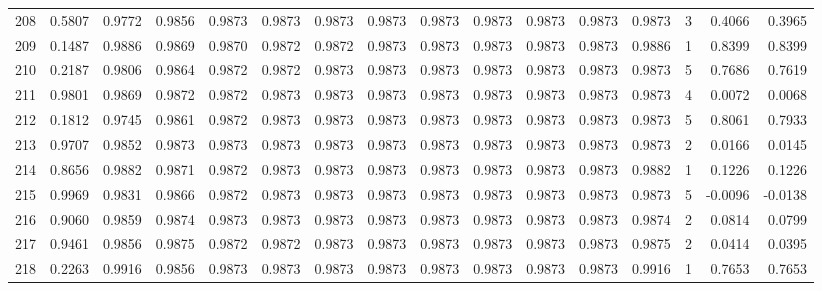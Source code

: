 \begin{tabular}{lrrrrrrrrrrrrrrr}
208 &      0.5807 &  0.9772 &  0.9856 &  0.9873 &  0.9873 &  0.9873 &  0.9873 &  0.9873 &  0.9873 &  0.9873 &   0.9873 &     0.9873 &      3 &                    0.4066 &                     0.3965 \\
209 &      0.1487 &  0.9886 &  0.9869 &  0.9870 &  0.9872 &  0.9872 &  0.9873 &  0.9873 &  0.9873 &  0.9873 &   0.9873 &     0.9886 &      1 &                    0.8399 &                     0.8399 \\
210 &      0.2187 &  0.9806 &  0.9864 &  0.9872 &  0.9872 &  0.9873 &  0.9873 &  0.9873 &  0.9873 &  0.9873 &   0.9873 &     0.9873 &      5 &                    0.7686 &                     0.7619 \\
211 &      0.9801 &  0.9869 &  0.9872 &  0.9872 &  0.9873 &  0.9873 &  0.9873 &  0.9873 &  0.9873 &  0.9873 &   0.9873 &     0.9873 &      4 &                    0.0072 &                     0.0068 \\
212 &      0.1812 &  0.9745 &  0.9861 &  0.9872 &  0.9873 &  0.9873 &  0.9873 &  0.9873 &  0.9873 &  0.9873 &   0.9873 &     0.9873 &      5 &                    0.8061 &                     0.7933 \\
213 &      0.9707 &  0.9852 &  0.9873 &  0.9873 &  0.9873 &  0.9873 &  0.9873 &  0.9873 &  0.9873 &  0.9873 &   0.9873 &     0.9873 &      2 &                    0.0166 &                     0.0145 \\
214 &      0.8656 &  0.9882 &  0.9871 &  0.9872 &  0.9873 &  0.9873 &  0.9873 &  0.9873 &  0.9873 &  0.9873 &   0.9873 &     0.9882 &      1 &                    0.1226 &                     0.1226 \\
215 &      0.9969 &  0.9831 &  0.9866 &  0.9872 &  0.9873 &  0.9873 &  0.9873 &  0.9873 &  0.9873 &  0.9873 &   0.9873 &     0.9873 &      5 &                   -0.0096 &                    -0.0138 \\
216 &      0.9060 &  0.9859 &  0.9874 &  0.9873 &  0.9873 &  0.9873 &  0.9873 &  0.9873 &  0.9873 &  0.9873 &   0.9873 &     0.9874 &      2 &                    0.0814 &                     0.0799 \\
217 &      0.9461 &  0.9856 &  0.9875 &  0.9872 &  0.9872 &  0.9873 &  0.9873 &  0.9873 &  0.9873 &  0.9873 &   0.9873 &     0.9875 &      2 &                    0.0414 &                     0.0395 \\
218 &      0.2263 &  0.9916 &  0.9856 &  0.9873 &  0.9873 &  0.9873 &  0.9873 &  0.9873 &  0.9873 &  0.9873 &   0.9873 &     0.9916 &      1 &                    0.7653 &                     0.7653 \\

\end{tabular}
